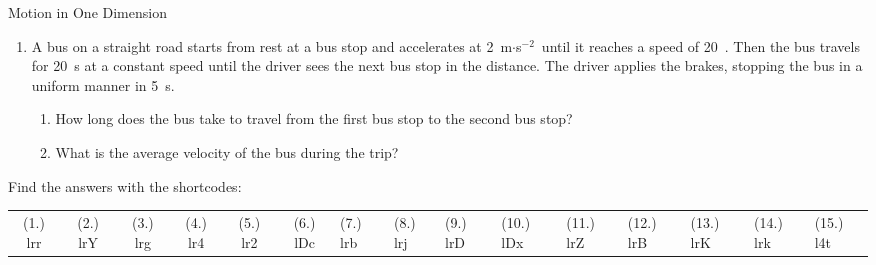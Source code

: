 \begin{eocexercises}{Motion in One Dimension}
\begin{enumerate}[noitemsep, label=\textbf{\arabic*}. ]
\item{A bus on a straight road starts from rest at a bus stop and accelerates at 2~m$\cdot$s$^{-2}$\ until it reaches a speed of 20~\ms. Then the bus travels for 20~s at a constant speed until the driver sees the next bus stop in the distance. The driver applies the brakes, stopping the bus in a uniform manner in 5~s.
\begin{enumerate}
\item How long does the bus take to travel from the first bus stop to the second bus stop?
\item What is the average velocity of the bus during the trip?
\end{enumerate}}
\end{enumerate}
\par {} Find the answers with the shortcodes:
 \par \begin{tabular}[h]{cccccc}
 (1.) lrr  &  (2.) lrY  &  (3.) lrg  &  (4.) lr4  &  (5.) lr2  &  (6.) lDc  & (7.) lrb & (8.) lrj & (9.) lrD & (10.) lDx &
(11.) lrZ & (12.) lrB & (13.) lrK & (14.) lrk & (15.) l4t
 \end{tabular}
\end{eocexercises}
